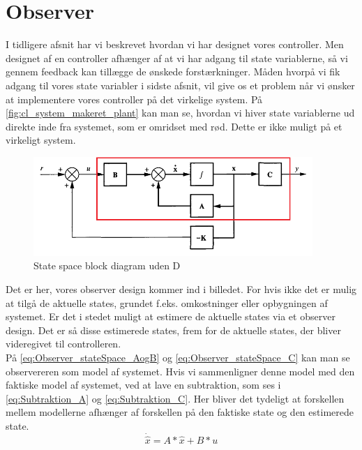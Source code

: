 \graphicspath{{Chapters/Observer/}}

\section{Observer}
I tidligere afsnit har vi beskrevet hvordan vi har designet vores controller. Men designet af en controller afhænger af at vi har adgang til state variablerne, så vi gennem feedback kan tillægge de ønskede forstærkninger. Måden hvorpå vi fik adgang til vores state variabler i sidste afsnit, vil give os et problem når vi ønsker at implementere vores controller på det virkelige system. På \autoref{fig:cl_system_makeret_plant} kan man se, hvordan vi hiver state variablerne ud direkte inde fra systemet, som er omridset med rød. Dette er ikke muligt på et virkeligt system.

\begin{figure}[H]
	\centering
	\includegraphics[width = 300pt]{Img/cl_system_makeret_plant.PNG}
	\caption{State space block diagram uden D}
	\label{fig:cl_system_makeret_plant}
\end{figure}


Det er her, vores observer design kommer ind i billedet. For hvis ikke det er mulig at tilgå de aktuelle states, grundet f.eks. omkostninger eller opbygningen af systemet. Er det i stedet muligt at estimere de aktuelle states via et observer design. Det er så disse estimerede states, frem for de aktuelle states, der bliver videregivet til controlleren.\\
På \autoref{eq:Observer_stateSpace_AogB} og \autoref{eq:Observer_stateSpace_C} kan man se observereren som model af systemet. Hvis vi sammenligner denne model med den faktiske model af systemet, ved at lave en subtraktion, som ses i  \autoref{eq:Subtraktion_A} og \autoref{eq:Subtraktion_C}. Her bliver det tydeligt at forskellen mellem modellerne afhænger af forskellen på den faktiske state og den estimerede state. 
\begin{equation}
\dot{\hat{x}} = A * \hat{x} + B * u
\label{eq:Observer_stateSpace_AogB}
\end{equation}

